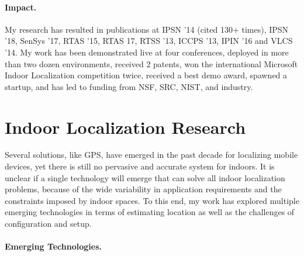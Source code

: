 \documentclass[10pt]{article}
\begin{document}

\paragraph{Impact. }
My research has resulted in publications at IPSN '14 (cited 130+ times), IPSN '18, SenSys '17, RTAS '15, RTAS 
17, RTSS '13, ICCPS '13, IPIN '16 and VLCS '14. My work has been demonstrated live at four conferences, deployed in more than two dozen environments, received 2 patents, won the international Microsoft Indoor Localization competition twice, received a best demo award, spawned a startup, and has led to funding from NSF, SRC, NIST, and industry. %


\section{Indoor Localization Research}

Several solutions, like GPS, have emerged in the past decade for localizing mobile devices, yet there is still no pervasive and accurate system for indoors.  It is unclear if a single technology will emerge that can solve all indoor localization problems, because of the wide variability in application requirements and the constraints imposed by indoor spaces.  %
To this end, my work has explored multiple emerging technologies in terms of estimating location as well as the challenges of configuration and setup.


\paragraph{Emerging Technologies. }

\end{document}
